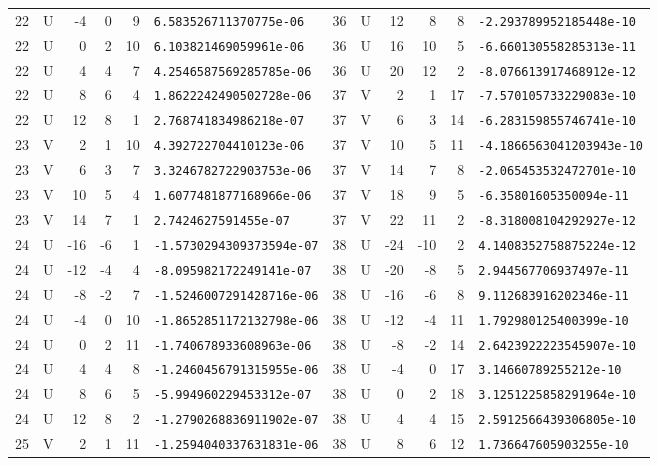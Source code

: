 \begin{longtable}{rcrrrl|rcrrrl}
22 & U & -4 & 0 & 9 & \texttt{6.583526711370775e-06} & 36 & U & 12 & 8 & 8 & \texttt{-2.293789952185448e-10}\\
22 & U & 0 & 2 & 10 & \texttt{6.103821469059961e-06} & 36 & U & 16 & 10 & 5 & \texttt{-6.660130558285313e-11}\\
22 & U & 4 & 4 & 7 & \texttt{4.2546587569285785e-06} & 36 & U & 20 & 12 & 2 & \texttt{-8.076613917468912e-12}\\
22 & U & 8 & 6 & 4 & \texttt{1.8622242490502728e-06} & 37 & V & 2 & 1 & 17 & \texttt{-7.570105733229083e-10}\\
22 & U & 12 & 8 & 1 & \texttt{2.768741834986218e-07} & 37 & V & 6 & 3 & 14 & \texttt{-6.283159855746741e-10}\\
23 & V & 2 & 1 & 10 & \texttt{4.392722704410123e-06} & 37 & V & 10 & 5 & 11 & \texttt{-4.1866563041203943e-10}\\
23 & V & 6 & 3 & 7 & \texttt{3.3246782722903753e-06} & 37 & V & 14 & 7 & 8 & \texttt{-2.065453532472701e-10}\\
23 & V & 10 & 5 & 4 & \texttt{1.6077481877168966e-06} & 37 & V & 18 & 9 & 5 & \texttt{-6.35801605350094e-11}\\
23 & V & 14 & 7 & 1 & \texttt{2.7424627591455e-07} & 37 & V & 22 & 11 & 2 & \texttt{-8.318008104292927e-12}\\
24 & U & -16 & -6 & 1 & \texttt{-1.5730294309373594e-07} & 38 & U & -24 & -10 & 2 & \texttt{4.1408352758875224e-12}\\
24 & U & -12 & -4 & 4 & \texttt{-8.095982172249141e-07} & 38 & U & -20 & -8 & 5 & \texttt{2.944567706937497e-11}\\
24 & U & -8 & -2 & 7 & \texttt{-1.5246007291428716e-06} & 38 & U & -16 & -6 & 8 & \texttt{9.112683916202346e-11}\\
24 & U & -4 & 0 & 10 & \texttt{-1.8652851172132798e-06} & 38 & U & -12 & -4 & 11 & \texttt{1.792980125400399e-10}\\
24 & U & 0 & 2 & 11 & \texttt{-1.740678933608963e-06} & 38 & U & -8 & -2 & 14 & \texttt{2.6423922223545907e-10}\\
24 & U & 4 & 4 & 8 & \texttt{-1.2460456791315955e-06} & 38 & U & -4 & 0 & 17 & \texttt{3.14660789255212e-10}\\
24 & U & 8 & 6 & 5 & \texttt{-5.994960229453312e-07} & 38 & U & 0 & 2 & 18 & \texttt{3.1251225858291964e-10}\\
24 & U & 12 & 8 & 2 & \texttt{-1.2790268836911902e-07} & 38 & U & 4 & 4 & 15 & \texttt{2.5912566439306805e-10}\\
25 & V & 2 & 1 & 11 & \texttt{-1.2594040337631831e-06} & 38 & U & 8 & 6 & 12 & \texttt{1.736647605903255e-10}\\

\end{longtable}
